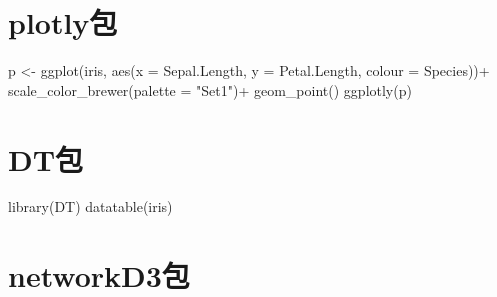 \documentclass[
]{book}
\newenvironment{Shaded}{\begin{snugshade}}{\end{snugshade}}
\newcommand{\AttributeTok}[1]{\textcolor[rgb]{0.77,0.63,0.00}{#1}}
\newcommand{\FunctionTok}[1]{\textcolor[rgb]{0.00,0.00,0.00}{#1}}
\newcommand{\NormalTok}[1]{#1}
\newcommand{\OtherTok}[1]{\textcolor[rgb]{0.56,0.35,0.01}{#1}}
\newcommand{\SpecialCharTok}[1]{\textcolor[rgb]{0.00,0.00,0.00}{#1}}
\newcommand{\StringTok}[1]{\textcolor[rgb]{0.31,0.60,0.02}{#1}}
\begin{document}
\hypertarget{plotlyux5305}{%
\section{plotly包}\label{plotlyux5305}}

\begin{Shaded}
\end{Shaded}

\begin{Shaded}
\begin{Highlighting}[]
\NormalTok{p }\OtherTok{\textless{}{-}} \FunctionTok{ggplot}\NormalTok{(iris, }\FunctionTok{aes}\NormalTok{(}\AttributeTok{x =}\NormalTok{ Sepal.Length, }\AttributeTok{y =}\NormalTok{ Petal.Length, }\AttributeTok{colour =}\NormalTok{ Species))}\SpecialCharTok{+}
  \FunctionTok{scale\_color\_brewer}\NormalTok{(}\AttributeTok{palette =} \StringTok{"Set1"}\NormalTok{)}\SpecialCharTok{+}
  \FunctionTok{geom\_point}\NormalTok{()}
\FunctionTok{ggplotly}\NormalTok{(p)}
\end{Highlighting}
\end{Shaded}

\hypertarget{dtux5305}{%
\section{DT包}\label{dtux5305}}

\begin{Shaded}
\begin{Highlighting}[]
\FunctionTok{library}\NormalTok{(DT)}
\FunctionTok{datatable}\NormalTok{(iris)}
\end{Highlighting}
\end{Shaded}

\hypertarget{networkd3ux5305}{%
\section{networkD3包}\label{networkd3ux5305}}
\end{document}
